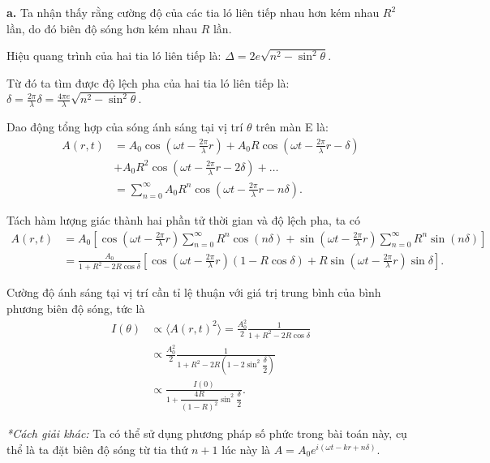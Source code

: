 \textbf{a.} Ta nhận thấy rằng cường độ của các tia ló liên tiếp nhau hơn kém nhau $R^2$ lần, do đó biên độ sóng hơn kém nhau $R$ lần.

Hiệu quang trình của hai tia ló liên tiếp là: $\displaystyle \Delta = 2e \sqrt{n^2 - \sin^2 \theta}$.

Từ đó ta tìm được độ lệch pha của hai tia ló liên tiếp là: $\displaystyle \delta = \frac{2\pi}{\lambda} \delta = \frac{4 \pi e}{\lambda} \sqrt{n^2 - \sin^2 \theta}$.

Dao động tổng hợp của sóng ánh sáng tại vị trí $\theta$ trên màn E là:
\begin{align}
    A(r,t) &= A_0 \cos \left(\omega t - \frac{2\pi}{\lambda} r\right) + A_0 R\cos \left(\omega t - \frac{2\pi}{\lambda} r- \delta\right)\\
    &+ A_0 R^2 \cos \left(\omega t - \frac{2\pi}{\lambda} r- 2\delta\right) + \ldots\\ 
    &= \sum_{n=0}^\infty A_0 R^n \cos \left(\omega t - \frac{2\pi}{\lambda} r- n\delta\right). \label{41}
\end{align}

Tách hàm lượng giác thành hai phần tử thời gian và độ lệch pha, ta có
\begin{align}
    A(r,t) &= A_0 \left[\cos \left(\omega t - \frac{2\pi}{\lambda} r\right) \sum_{n=0}^\infty R^n \cos (n\delta) + \sin \left(\omega t - \frac{2\pi}{\lambda} r\right) \sum_{n=0}^\infty R^n \sin(n\delta) \right]\\
    &= \frac{A_0}{1 + R^2 - 2R \cos \delta} \left[ \cos \left(\omega t - \frac{2\pi}{\lambda} r\right) (1 - R\cos \delta) + R\sin \left(\omega t - \frac{2\pi}{\lambda} r\right) \sin \delta\right]. \label{42}
\end{align}

Cường độ ánh sáng tại vị trí cần tỉ lệ thuận với giá trị trung bình của bình phương biên độ sóng, tức là
\begin{align}
    I(\theta) &\propto \langle A(r,t)^2 \rangle =  \frac{A_0^2}{2} \frac{1}{1 + R^2 - 2R\cos \delta} \label{43}\\
    &\propto \frac{A_0^2}{2} \frac{1}{1 + R^2 -2R \left(1 - 2 \sin^2 \dfrac{\delta}{2} \right)}\\
    &\propto \frac{I(0)}{1 + \dfrac{4R}{(1-R)^2} \sin^2 \dfrac{\delta}{2}}.\label{44}
\end{align}

\textit{*Cách giải khác:} Ta có thể sử dụng phương pháp số phức trong bài toán này, cụ thể là ta đặt biên độ sóng từ tia thứ $n+1$ lúc này là $A = A_0 e^{i(\omega t - k r + n \delta)}$.

